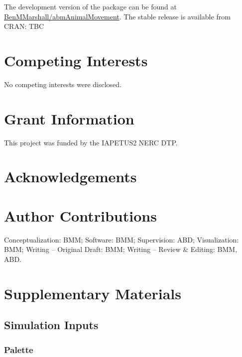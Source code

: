 \documentclass[10pt,a4paper]{article}
\begin{document}
The development version of the package can be found at \href{https://github.com/BenMMarshall/abmAnimalMovement}{BenMMarshall/abmAnimalMovement}.
The stable release is available from CRAN: TBC

\hypertarget{competing-interests}{%
\section{Competing Interests}\label{competing-interests}}

No competing interests were disclosed.

\hypertarget{grant-information}{%
\section{Grant Information}\label{grant-information}}

This project was funded by the IAPETUS2 NERC DTP.

\hypertarget{acknowledgements}{%
\section{Acknowledgements}\label{acknowledgements}}

\hypertarget{author-contributions}{%
\section{Author Contributions}\label{author-contributions}}

Conceptualization: BMM;
Software: BMM;
Supervision: ABD;
Visualization: BMM;
Writing -- Original Draft: BMM;
Writing -- Review \& Editing: BMM, ABD.

\setcounter{table}{0}  \renewcommand{\thetable}{S\arabic{table}} \setcounter{figure}{0} \renewcommand{\thefigure}{S\arabic{figure}}

\hypertarget{supplementary-materials}{%
\section{Supplementary Materials}\label{supplementary-materials}}

\hypertarget{simulation-inputs}{%
\subsection{Simulation Inputs}\label{simulation-inputs}}

\hypertarget{palette}{%
\subsubsection{Palette}\label{palette}}
\end{document}
